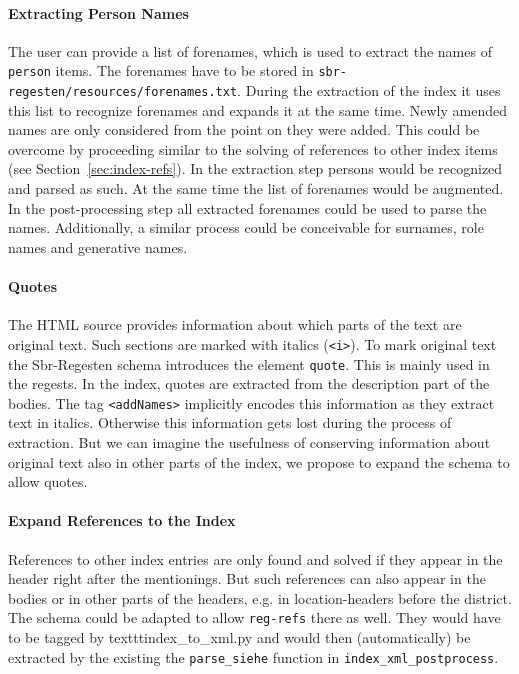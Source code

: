 \paragraph{Extracting Person Names}
The user can provide a list of forenames, which is used to extract the
names of \texttt{person} items. The forenames have to be stored in
\texttt{sbr-regesten/resources/forenames.txt}. During the extraction
of the index it uses this list to recognize forenames and expands it
at the same time. Newly amended names are only considered from the
point on they were added. This could be overcome by proceeding similar
to the solving of references to other index items (see
Section~\ref{sec:index-refs}). In the extraction step persons would be
recognized and parsed as such. At the same time the list of forenames
would be augmented. In the post-processing step all extracted
forenames could be used to parse the names. Additionally, a similar
process could be conceivable for surnames, role names and generative
names.

\paragraph{Quotes}
The HTML source provides information about which parts of the text are
original text. Such sections are marked with italics (\texttt{<i>}).
To mark original text the Sbr-Regesten schema introduces the element
\texttt{quote}. This is mainly used in the regests. In the index,
quotes are extracted from the description part of the bodies. The tag
\texttt{<addNames>} implicitly encodes this information as they
extract text in italics. Otherwise this information gets lost during
the process of extraction. But we can imagine the usefulness of
conserving information about original text also in other parts of the
index, we propose to expand the schema to allow quotes.

\paragraph{Expand References to the Index}
References to other index entries are only found and solved if they
appear in the header right after the mentionings. But such references
can also appear in the bodies or in other parts of the headers, e.g.
in location-headers before the district. The schema could be adapted
to allow \texttt{reg-refs} there as well. They would have to be tagged
by texttt{index\_to\_xml.py} and would then (automatically) be
extracted by the existing the \texttt{parse\_siehe} function in
\texttt{index\_xml\_postprocess}.


